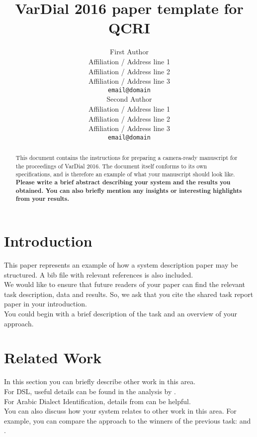 \documentclass[11pt]{article}
\title{VarDial 2016 paper template for QCRI}
\author{First Author \\
  Affiliation / Address line 1 \\
  Affiliation / Address line 2 \\
  Affiliation / Address line 3 \\
  {\tt email@domain} \\\And
  Second Author \\
  Affiliation / Address line 1 \\
  Affiliation / Address line 2 \\
  Affiliation / Address line 3 \\
  {\tt email@domain} \\}
\date{}
\begin{document}
\maketitle
\begin{abstract}
  This document contains the instructions for preparing a camera-ready
  manuscript for the proceedings of VarDial 2016. The document itself
  conforms to its own specifications, and is therefore an example of
  what your manuscript should look like. \bf Please write a brief abstract describing your system and the results you obtained. You can also briefly mention any insights or interesting highlights from your results.
\end{abstract}



\section{Introduction}
\label{intro}

This paper represents an example of how a system description paper may be structured. A bib file with relevant references is also included.
\\

We would like to ensure that future readers of your paper can find the relevant task description, data and results. So, we ask that you cite the shared task report paper \cite{dsl2016} in your introduction.
\\

You could begin with a brief description of the task and an overview of your approach. 


\section{Related Work}

In this section you can briefly describe other work in this area.
\\

For DSL, useful details can be found in the analysis by .
\\

For Arabic Dialect Identification, details from  can be helpful.
\\

You can also discuss how your system relates to other work in this area. For example, you can compare the approach to the winners of the previous task: \cite{malmasi-dras:2015:LT4VarDial} and \cite{goutte-leger:2015:LT4VarDial}.
\end{document}
